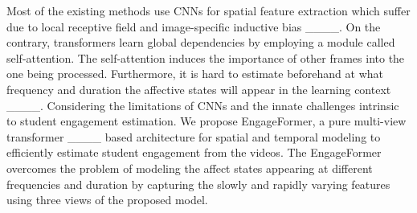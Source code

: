 Most of the existing methods use CNNs for spatial feature extraction which suffer due to local receptive field and image-specific inductive bias ____.
 On the contrary, transformers learn global dependencies by employing a module called self-attention. The self-attention induces the importance of other frames into the one being processed. Furthermore, it is hard to estimate beforehand at what frequency and duration the affective states will appear in the learning context ____. Considering the limitations of CNNs and the innate challenges intrinsic to student engagement estimation. We propose EngageFormer, a pure multi-view transformer ____ based architecture for spatial and temporal modeling to efficiently estimate student engagement from the videos. The EngageFormer overcomes the problem of modeling the affect states appearing at different frequencies and duration by capturing the slowly and rapidly varying features using three views of the proposed model.